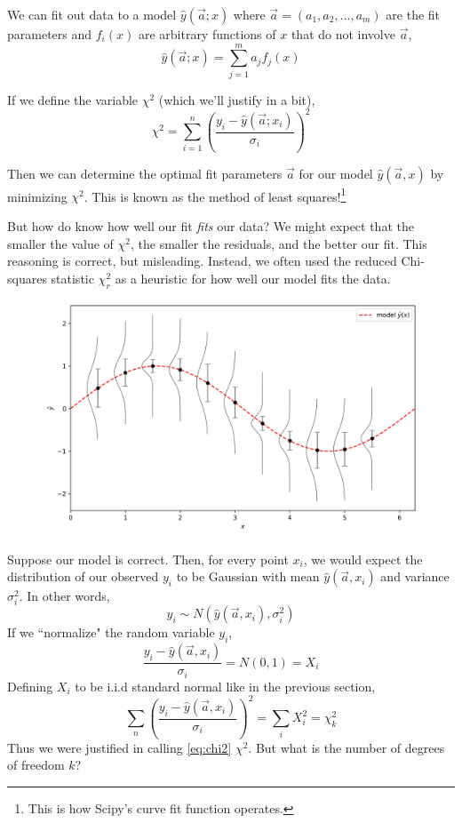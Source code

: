 \documentclass[12pt]{article}
\numberwithin{equation}{section}
\theoremstyle{definition}
\begin{document}
We can fit out data to a model $ \hat{y}(\vec{a}; x) $ where $ \vec{a} = (a_1, a_2, \dots, a_m) $ are the fit parameters and $ f_i(x) $ are arbitrary functions of $ x $ that do not involve $ \vec{a} $,
\begin{equation}
		\hat{y}(\vec{a}; x) = \sum_{j=1}^m a_j f_j(x)
		\label{eq:linear}
\end{equation}

If we define the variable $ \chi^2 $ (which we'll justify in a bit),
\begin{equation}
		\chi^2 = \sum_{i=1}^n \left( \frac{y_i-\hat{y}(\vec{a}; x_i)}{\sigma_i}\right)^2
		\label{eq:chi2}
\end{equation}

Then we can determine the optimal fit parameters $\vec{a}$ for our model $\hat{y}(\vec{a}, x)$ by minimizing $\chi^2$. This is known as the method of least squares!\footnote{This is how Scipy's curve fit function operates.}

But how do know how well our fit \textit{fits} our data? We might expect that the smaller the value of $\chi^2$, the smaller the residuals, and the better our fit. This reasoning is correct, but misleading. Instead, we often used the reduced Chi-squares statistic $\chi^2_r$ as a heuristic for how well our model fits the data.

\begin{figure}[H]
	\centering
	\includegraphics[width=12cm] {model}
\end{figure}

Suppose our model is correct. Then, for every point $ x_i $, we would expect the distribution of our observed $ y_i $ to be Gaussian with mean $ \hat{y}(\vec{a}, x_i) $ and variance $ \sigma_i^2 $. In other words,
\begin{equation}
		y_i \sim N\left(\hat{y}(\vec{a}, x_i) , \sigma_i^2\right)
\end{equation}
If we ``normalize" the random variable $ y_i $,
\begin{equation}
		\frac{y_i - \hat{y}(\vec{a}, x_i) }{\sigma_i} = N(0,1) = X_i
\end{equation}
Defining $ X_i $ to be i.i.d standard normal like in the previous section,
\begin{equation}
		\sum_n 	\left(\frac{y_i - \hat{y}(\vec{a}, x_i) }{\sigma_i}\right)^2 = \sum_i X_i^2 = \chi^2_k
\end{equation}
Thus we were justified in calling \ref{eq:chi2} $\chi^2$. But what is the number of degrees of freedom $ k $? 
\end{document}
